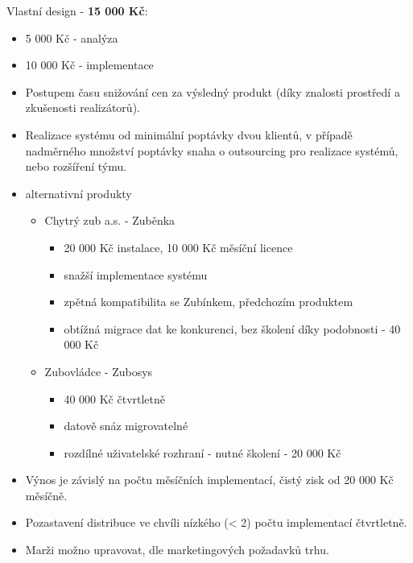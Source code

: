 \documentclass[11pt, a4paper, titlepage]{article}
\begin{document}
		Vlastní design - \textbf{15 000 Kč}:
		\begin{itemize}
			\item 5 000 Kč - analýza
			\item 10 000 Kč - implementace
		\end{itemize}

		\begin{itemize}
			\item Postupem času snižování cen za výsledný produkt (díky znalosti prostředí a zkušenosti realizátorů).
			\item Realizace systému od minimální poptávky dvou klientů, v případě nadměrného množství poptávky snaha o outsourcing pro realizace systémů, nebo rozšíření týmu.
			\item alternativní produkty
			\begin{itemize}
				\item Chytrý zub a.s. - Zuběnka
				\begin{itemize}
					\item 20 000 Kč instalace, 10 000 Kč měsíční licence
					\item snažší implementace systému
					\item zpětná kompatibilita se Zubínkem, předchozím produktem
					\item obtížná migrace dat ke konkurenci, bez školení díky podobnosti - 40 000 Kč
				\end{itemize}
				\item Zubovládce - Zubosys
				\begin{itemize}
					\item 40 000 Kč čtvrtletně
					\item datově snáz migrovatelné
					\item rozdílné uživatelské rozhraní - nutné školení - 20 000 Kč
				\end{itemize}
			\end{itemize}
			\item Výnos je závislý na počtu měsíčních implementací, čistý zisk od 20 000 Kč měsíčně.
			\item Pozastavení distribuce ve chvíli nízkého (< 2) počtu implementací čtvrtletně.
			\item Marži možno upravovat, dle marketingových požadavků trhu.
		\end{itemize}
		
\end{document}
